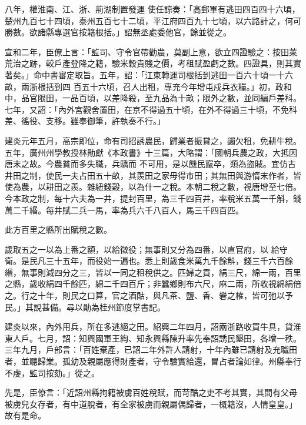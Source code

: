 \begin{pinyinscope}
 八年，權淮南、江、浙、荊湖制置發運
 使任諒奏：「高郵軍有逃田四百四十六頃，楚州九百七十四頃，泰州五百七十二頃，平江府四百九十七頃，以六路計之，何可勝數。欲諸縣專選官按籍根括。」詔無丞處委他官，餘並從之。



 宣和二年，臣僚上言：「監司、守令官帶勸農，莫副上意，欲立四證驗之：按田萊荒治之跡，較戶產登降之籍，驗米穀貴賤之價，考租賦盈虧之數。四證具，則其實著矣。」命中書審定取旨。五年，詔：「江東轉運司根括到逃田一百六十頃一十六畝，兩浙根括到四
 百五十六頃，召人出租，專充今年增屯戍兵衣糧。」初，政和中，品官限田，一品百頃，以差降殺，至九品為十畝；限外之數，並同編戶差科。七年，又詔：「內外宮觀舍置田，在京不得過五十頃，在外不得過三十頃，不免科差、徭役、支移。雖奉御筆，許執奏不行。」



 建炎元年五月，高宗即位，命有司招誘農民，歸業者振貸之，蠲欠租，免耕牛稅。五年，廣州州學教授林勛獻《本政書》十三篇，大略謂：「國朝兵農之政，大抵因唐末之故。今農貧而多失職，兵驕而
 不可用，是以饑民竄卒，類為盜賊。宜仿古井田之制，使民一夫占田五十畝，其羨田之家毋得市田；其無田與游惰末作者，皆使為農，以耕田之羨。雜紐錢穀，以為什一之稅。本朝二稅之數，視唐增至七倍。今本政之制，每十六夫為一井，提封百里，為三千四百井，率稅米五萬一千斛，錢萬二千緡。每井賦二兵一馬，率為兵六千八百人，馬三千四百匹。



 此方百里之縣所出賦稅之數。



 歲取五之一以為上番之額，以給徵役；無事則又分為四番，以直官府，以
 給守衛。是民凡三十五年，而役始一遍也。悉上則歲食米萬九千餘斛，錢三千六百餘緡，無事則減四分之三，皆以一同之租稅供之。匹婦之貢，絹三尺，綿一兩，百里之縣，歲收絹四千餘匹，綿二千四百斤；非蠶鄉則布六尺，麻二兩，所收視綿絹倍之。行之十年，則民之口算，官之酒酤，與凡茶、鹽、香、礬之榷，皆可弛以予民。」其說甚備。尋以勛為桂州節度掌書記。



 建炎以來，內外用兵，所在多逃絕之田。紹興二年四月，詔兩浙路收買牛具，貸淮
 東人戶。七月，詔：知興國軍王綯、知永興縣陳升率先奉詔誘民墾田，各增一秩。三年九月，戶部言：「百姓棄產，已詔二年外許人請射，十年內雖已請射及充職田者，並聽歸業。孤幼及親屬應得財產者，守令驗實給還，冒占者論如律。州縣奉行不虔，監司按劾。」從之。



 先是，臣僚言：「近詔州縣拘籍被虜百姓稅賦，而苛酷之吏不考其實，其間有父母被虜兒女存者，有中道脫者，有全家被虜而親屬偶歸者，一概籍沒，人情皇皇。」故有是命。




\end{pinyinscope}
